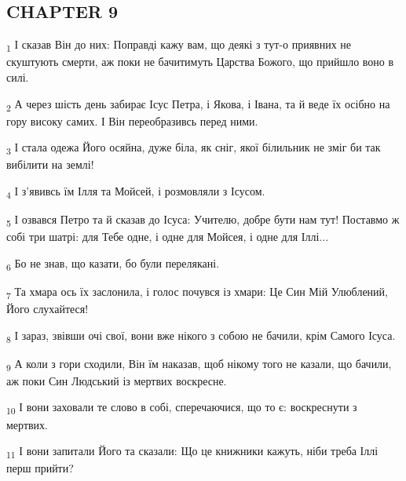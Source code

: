 \subsection{CHAPTER 9}
\begin{tcolorbox}
\textsubscript{1} І сказав Він до них: Поправді кажу вам, що деякі з тут-о приявних не скуштують смерти, аж поки не бачитимуть Царства Божого, що прийшло воно в силі.
\end{tcolorbox}
\begin{tcolorbox}
\textsubscript{2} А через шість день забирає Ісус Петра, і Якова, і Івана, та й веде їх осібно на гору високу самих. І Він переобразивсь перед ними.
\end{tcolorbox}
\begin{tcolorbox}
\textsubscript{3} І стала одежа Його осяйна, дуже біла, як сніг, якої білильник не зміг би так вибілити на землі!
\end{tcolorbox}
\begin{tcolorbox}
\textsubscript{4} І з'явивсь їм Ілля та Мойсей, і розмовляли з Ісусом.
\end{tcolorbox}
\begin{tcolorbox}
\textsubscript{5} І озвався Петро та й сказав до Ісуса: Учителю, добре бути нам тут! Поставмо ж собі три шатрі: для Тебе одне, і одне для Мойсея, і одне для Іллі...
\end{tcolorbox}
\begin{tcolorbox}
\textsubscript{6} Бо не знав, що казати, бо були перелякані.
\end{tcolorbox}
\begin{tcolorbox}
\textsubscript{7} Та хмара ось їх заслонила, і голос почувся із хмари: Це Син Мій Улюблений, Його слухайтеся!
\end{tcolorbox}
\begin{tcolorbox}
\textsubscript{8} І зараз, звівши очі свої, вони вже нікого з собою не бачили, крім Самого Ісуса.
\end{tcolorbox}
\begin{tcolorbox}
\textsubscript{9} А коли з гори сходили, Він їм наказав, щоб нікому того не казали, що бачили, аж поки Син Людський із мертвих воскресне.
\end{tcolorbox}
\begin{tcolorbox}
\textsubscript{10} І вони заховали те слово в собі, сперечаючися, що то є: воскреснути з мертвих.
\end{tcolorbox}
\begin{tcolorbox}
\textsubscript{11} І вони запитали Його та сказали: Що це книжники кажуть, ніби треба Іллі перш прийти?
\end{tcolorbox}
